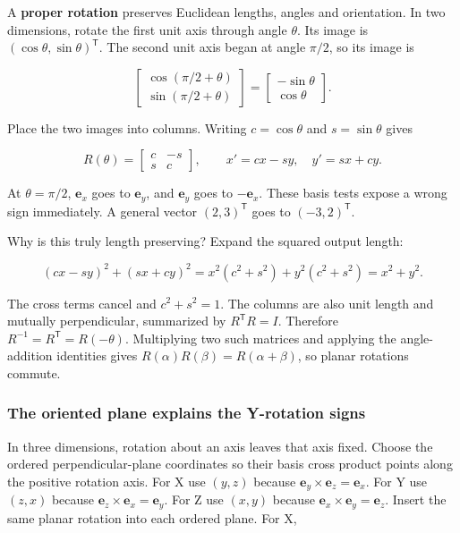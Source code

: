 \hypertarget{01-foundations-i-ch018-derive-rotations-from-the-directions-that-stay-fixed}{}

A \textbf{proper rotation} preserves Euclidean lengths, angles and orientation. In two dimensions, rotate the first unit axis through angle \(\theta\). Its image is \((\cos\theta,\sin\theta)^{\mathsf T}\). The second unit axis began at angle \(\pi/2\), so its image is

\[
\begin{bmatrix}\cos(\pi/2+\theta)\\\sin(\pi/2+\theta)\end{bmatrix}
=\begin{bmatrix}-\sin\theta\\\cos\theta\end{bmatrix}.
\]

Place the two images into columns. Writing \(c=\cos\theta\) and \(s=\sin\theta\) gives

\[
R(\theta)=\begin{bmatrix}c&-s\\s&c\end{bmatrix},\qquad
x'=cx-sy,\quad y'=sx+cy.
\]

At \(\theta=\pi/2\), \(\mathbf e_x\) goes to \(\mathbf e_y\), and \(\mathbf e_y\) goes to \(-\mathbf e_x\). These basis tests expose a wrong sign immediately. A general vector \((2,3)^{\mathsf T}\) goes to \((-3,2)^{\mathsf T}\).

Why is this truly length preserving? Expand the squared output length:

\[
(cx-sy)^2+(sx+cy)^2
=x^2(c^2+s^2)+y^2(c^2+s^2)=x^2+y^2.
\]

The cross terms cancel and \(c^2+s^2=1\). The columns are also unit length and mutually perpendicular, summarized by \(R^{\mathsf T}R=I\). Therefore \(R^{-1}=R^{\mathsf T}=R(-\theta)\). Multiplying two such matrices and applying the angle-addition identities gives \(R(\alpha)R(\beta)=R(\alpha+\beta)\), so planar rotations commute.

\subsubsection{The oriented plane explains the Y-rotation signs}\label{01-foundations-i-ch018-the-oriented-plane-explains-the-y-rotation-signs}

\hypertarget{01-foundations-i-ch018-the-oriented-plane-explains-the-y-rotation-signs}{}

In three dimensions, rotation about an axis leaves that axis fixed. Choose the ordered perpendicular-plane coordinates so their basis cross product points along the positive rotation axis. For X use \((y,z)\) because \(\mathbf e_y\times\mathbf e_z=\mathbf e_x\). For Y use \((z,x)\) because \(\mathbf e_z\times\mathbf e_x=\mathbf e_y\). For Z use \((x,y)\) because \(\mathbf e_x\times\mathbf e_y=\mathbf e_z\). Insert the same planar rotation into each ordered plane. For X,


